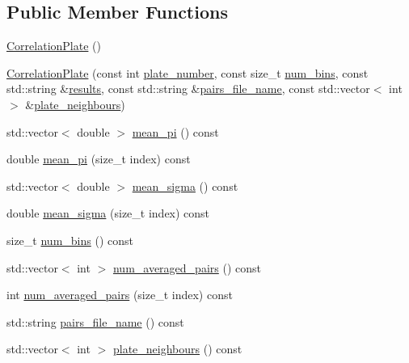 \subsection*{Public Member Functions}
\begin{DoxyCompactItemize}
\item 
\hyperlink{class_correlation_plate_a425183f37cd223a0cde0526e391b0558}{Correlation\-Plate} ()
\item 
\hyperlink{class_correlation_plate_a428b1a22cb7ed092b02546a89af1d8d1}{Correlation\-Plate} (const int \hyperlink{class_plate_a74d31939a29286c82ecd8fc7daf075ed}{plate\-\_\-number}, const size\-\_\-t \hyperlink{class_correlation_plate_a703ed8022866d1bbcc68bb5ae10ddbc3}{num\-\_\-bins}, const std\-::string \&\hyperlink{class_correlation_plate_a9af909d0d17ea8942c17b41e9379743c}{results}, const std\-::string \&\hyperlink{class_correlation_plate_a4b3fd30943868fb7c7e05bcad76d4e64}{pairs\-\_\-file\-\_\-name}, const std\-::vector$<$ int $>$ \&\hyperlink{class_correlation_plate_a197a4335cc4fbd6dab5b2da7431cbadc}{plate\-\_\-neighbours})
\item 
std\-::vector$<$ double $>$ \hyperlink{class_correlation_plate_a48f2550680d56a55bb7cf719a4ce65b2}{mean\-\_\-pi} () const 
\item 
double \hyperlink{class_correlation_plate_ab4c4d46291bfc8b7297e9fc2ac58512c}{mean\-\_\-pi} (size\-\_\-t index) const 
\item 
std\-::vector$<$ double $>$ \hyperlink{class_correlation_plate_aa1bbce0db890d496b7b60dd1e44d2894}{mean\-\_\-sigma} () const 
\item 
double \hyperlink{class_correlation_plate_a5344fb456d3b2a2172772c6d5b7dc777}{mean\-\_\-sigma} (size\-\_\-t index) const 
\item 
size\-\_\-t \hyperlink{class_correlation_plate_a703ed8022866d1bbcc68bb5ae10ddbc3}{num\-\_\-bins} () const 
\item 
std\-::vector$<$ int $>$ \hyperlink{class_correlation_plate_a9289ae56b96c65653388ab10074c29ee}{num\-\_\-averaged\-\_\-pairs} () const 
\item 
int \hyperlink{class_correlation_plate_ada9afe5f09d005fb9d0bf0f4787321fc}{num\-\_\-averaged\-\_\-pairs} (size\-\_\-t index) const 
\item 
std\-::string \hyperlink{class_correlation_plate_a4b3fd30943868fb7c7e05bcad76d4e64}{pairs\-\_\-file\-\_\-name} () const 
\item 
std\-::vector$<$ int $>$ \hyperlink{class_correlation_plate_a197a4335cc4fbd6dab5b2da7431cbadc}{plate\-\_\-neighbours} () const 

\end{DoxyCompactItemize}
